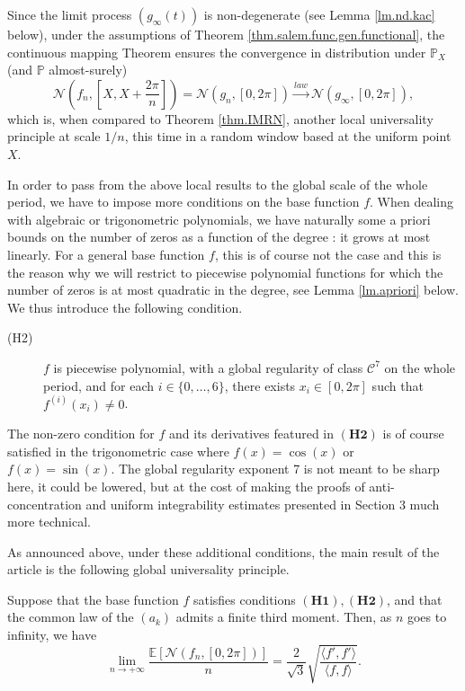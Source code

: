 \documentclass{svproc}
\newcommand \Esp {\mathbb{E}}
\begin{document}
\begin{remark}
Since the limit process $(g_{\infty}(t))$ is non-degenerate (see Lemma \ref{lm.nd.kac} below), under the assumptions of Theorem \ref{thm.salem.func.gen.functional}, the continuous mapping Theorem ensures the convergence in distribution under $\mathbb P_X$ (and $\mathbb P$ almost-surely)
\[ 
\mathcal N\left( f_{n} , \left[ X, X+\frac{2\pi}{n} \right]\right)=\mathcal N\left( g_{n} , \left[ 0, 2\pi \right]\right) \xrightarrow{law} \mathcal N\left( g_{\infty} , \left[ 0, 2\pi \right]\right),
\]
which is, when compared to Theorem \ref{thm.IMRN}, another local universality principle at scale $1/n$, this time in a random window based at the uniform point $X$.
\end{remark}
In order to pass from the above local results to the global scale of the whole period, we have to impose more conditions on the base function $f$. When dealing with algebraic or trigonometric polynomials, we have naturally some a priori bounds on the number of zeros as a function of the degree : it grows at most linearly. For a general base function $f$, this is of course not the case and this is the reason why we will restrict to piecewise polynomial functions for which the number of zeros is at most quadratic in the degree, see Lemma  \ref{lm.apriori} below. We thus introduce the following condition.
\begin{description}
\item[(H2)]
\;\;  $f$ is piecewise polynomial, with a global regularity of class $\mathcal{C}^{7}$ on the whole period, and for each $i\in \{0,\dots, 6\}$, there exists $x_i \in [0,2\pi]$ such that $f^{(i)}(x_i)\neq 0$. \end{description}

\begin{remark}
The non-zero condition for $f$ and its derivatives featured in $\mathbf{(H2)}$ is of course satisfied in the trigonometric case where $f(x)=\cos(x)$ or $f(x)=\sin(x)$. The global regularity exponent 7 is not meant to be sharp here, it could be lowered, but at the cost of making the proofs of anti-concentration and uniform integrability estimates presented in Section 3 much more technical.
\end{remark}
\par
\medskip
As announced above, under these additional conditions, the main result of the article is the following global universality principle.

\begin{theorem} \label{thm.mean.num} Suppose that the base function $f$ satisfies conditions $\mathbf{(H1)}, \mathbf{(H2)}$, and that the common law of the $(a_k)$ admits a finite third moment. Then, as $n$ goes to infinity, we have
$$\lim_{n\to +\infty} \frac{\Esp\left[\mathcal{N}(f_n,[0,2\pi])\right]}{n} = \frac{2}{\sqrt{3}} \sqrt{\frac{\langle f', f'\rangle}{\langle f, f\rangle}}.$$
\end{theorem}
\end{document}
